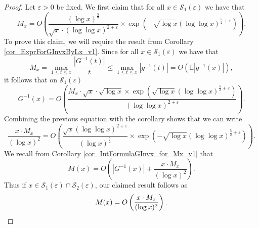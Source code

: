 \documentclass[11pt,reqno,a4letter]{article}
\numberwithin{figure}{section}
\numberwithin{table}{section}
\theoremstyle{plain}
\numberwithin{theorem}{section}
\theoremstyle{definition}
\begin{document}
\begin{proof} 
Let $\varepsilon > 0$ be fixed. 
We first claim that for all $x \in \mathcal{S}_1(\varepsilon)$ we have that 
\[
M_x = O\left(\frac{(\log x)^{\frac{5}{2}}}{\sqrt{x} \cdot (\log\log x)^{2 + \varepsilon}} \times 
     \exp\left(-\sqrt{\log x} (\log\log x)^{\frac{5}{2} + \varepsilon}\right) 
     \right). 
\]
To prove this claim, we will require the result from 
Corollary \ref{cor_ExprForGInvxByLx_v1}. Since 
for all $x \in \mathcal{S}_1(\varepsilon)$ we have that 
\[
M_x = \max_{1 \leq t \leq x} \frac{|G^{-1}(t)|}{t} \leq 
     \max_{1 \leq t \leq x} |g^{-1}(t)| = 
     \Theta(\mathbb{E}|g^{-1}(x)|), 
\]
it follows that on $\mathcal{S}_1(\varepsilon)$ 
\[
G^{-1}(x) = O\left(
     \frac{M_x \cdot \sqrt{x} \cdot \sqrt{\log x} \times 
     \exp\left(\sqrt{\log x} (\log\log x)^{\frac{5}{2} + \varepsilon}\right)}{ 
     (\log\log x)^{2 + \varepsilon}} 
     \right). 
\]
Combining the previous equation with the corollary shows that we can 
write 
\[
\frac{x \cdot M_x}{(\log x)^2} = O\left( 
     \frac{\sqrt{x} (\log\log x)^{2 + \varepsilon}}{(\log x)^{\frac{5}{2}}} \times 
     \exp\left(-\sqrt{\log x} (\log\log x)^{\frac{5}{2} + \varepsilon}\right) 
     \right). 
\]
We recall from Corollary \ref{cor_IntFormulaGInvx_for_Mx_v1} that 
\[
M(x) = O\left(|G^{-1}(x)| + \frac{x \cdot M_x}{(\log x)^2}\right). 
\]
Thus if $x \in \mathcal{S}_1(\varepsilon) \cap \mathcal{S}_2(\varepsilon)$, 
our claimed result follows as 
\[
M(x) = O\left(\frac{x \cdot M_x}{(\log x)^2}\right). 
     \qedhere 
\]
\end{proof} 
\end{document}
